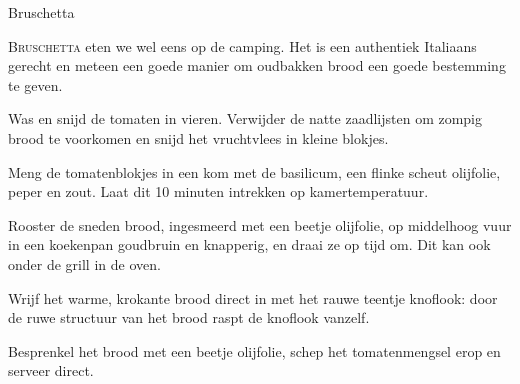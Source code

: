 \begin{recipe}{Bruschetta}


\lettrine{B}{ruschetta} eten we wel eens op de camping. Het is een authentiek
Italiaans gerecht en meteen een goede manier om oudbakken brood een goede
bestemming te geven.

\begin{ingredients}
\end{ingredients}

\begin{steps}
  \item Was en snijd de tomaten in vieren. Verwijder de natte zaadlijsten om
        zompig brood te voorkomen en snijd het vruchtvlees in kleine blokjes.
  \item Meng de tomatenblokjes in een kom met de basilicum, een flinke scheut
        olijfolie, peper en zout. Laat dit 10 minuten intrekken op
        kamertemperatuur.
  \item Rooster de sneden brood, ingesmeerd met een beetje olijfolie, op
        middelhoog vuur in een koekenpan goudbruin en knapperig, en draai ze
        op tijd om. Dit kan ook onder de grill in de oven.
  \item Wrijf het warme, krokante brood direct in met het rauwe teentje
        knoflook: door de ruwe structuur van het brood raspt de knoflook
        vanzelf.
  \item Besprenkel het brood met een beetje olijfolie, schep het
        tomatenmengsel erop en serveer direct.
\end{steps}
\end{recipe}
